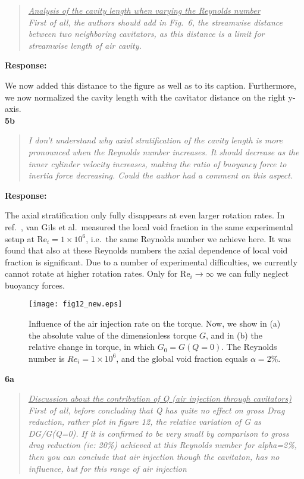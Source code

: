 \documentclass[10pt]{article}
\renewcommand{\Re}{\mathrm{Re}}
\newcommand{\strong}[1]{\textbf{#1}}
\newcommand{\question}[1]{\begin{quote} \emph{#1}  \end{quote} }
\begin{document}
\question{\underline{Analysis of the cavity length when varying the Reynolds number} \\
First of all, the authors should add in Fig.\ 6, the streamwise distance between two neighboring cavitators, as this distance is a limit for streamwise length of air cavity.
 }

\noindent \strong{Response:} 

\noindent We now added this distance to the figure as well as to its caption. Furthermore, we now normalized the cavity length with the cavitator distance on the right y-axis.\\

\noindent \strong{5b}

\question{I don't understand why axial stratification of the cavity length is more pronounced when the Reynolds number increases. It should decrease as the inner cylinder velocity increases, making the ratio of buoyancy force to inertia force decreasing. Could the author had a comment on this aspect. }

\noindent \strong{Response:} 

\noindent The axial stratification only fully disappears at even larger rotation rates. In ref.\ \cite{gil13}, van Gils et al.\ measured the local void fraction in the same experimental setup at $\Re_i = 1\times 10^6$, i.e.\ the same Reynolds number we achieve here. It was found that also at these Reynolds numbers the axial dependence of local void fraction is significant. Due to a number of experimental difficulties, we currently cannot rotate at higher rotation rates. Only for $\Re_i \to \infty$ we can fully neglect buoyancy forces.\\


\begin{figure}[htp]
\begin{center}
\texttt{[image: fig12\_new.eps]}
\caption{Influence of the air injection rate on the torque. Now, we show in (a) the absolute value of the dimensionless torque $G$, and in (b) the relative change in torque, in which $G_0 = G(Q=0)$. The Reynolds number is $Re_i = 1 \times 10^6$, and the global void fraction equals $\alpha = 2\%$.} 
\label{inject_new}
\end{center}
\end{figure} 

\noindent \strong{6a}

\question{\underline{Discussion about the contribution of Q (air injection through cavitators)} \\
First of all, before concluding that Q has quite no effect on gross Drag reduction, rather plot in figure 12, the relative variation of G as DG/G(Q=0). If it is confirmed to be very small by comparison to gross drag reduction (ie: 20\%) achieved at this Reynolds number for alpha=2\%, then you can conclude that air injection though the cavitaton, has no influence, but for this range of air injection
 }
\end{document}
